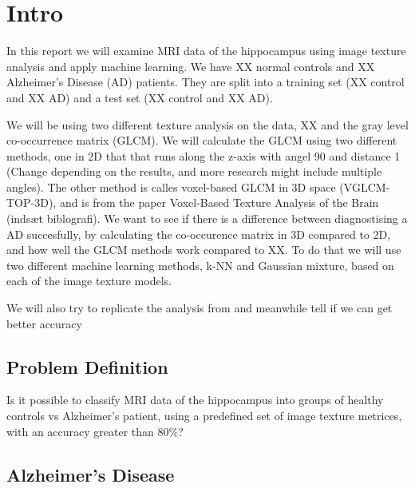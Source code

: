 \chapter{Intro}

In this report we will examine MRI data of the hippocampus using image texture analysis and apply machine learning. We have XX normal controls and XX Alzheimer's Disease (AD) patients. They are split into a training set (XX control and XX AD) and a test set (XX control and XX AD).

We will be using two different texture analysis on the data, XX and the gray level co-occ\-urren\-ce matrix (GLCM).
We will calculate the GLCM using two different methods, one in 2D that that runs along the z-axis with angel 90 and distance 1 (Change depending on the results, and more research might include multiple angles).\cite{Castellano}
The other method is calles voxel-based GLCM in 3D space (VGLCM-TOP-3D), and is from the paper Voxel-Based Texture Analysis of the Brain (indsæt biblografi).
We want to see if there is a difference between diagnostising a AD succesfully, by calculating the co-occurence matrix in 3D compared to 2D, and how well the GLCM methods work
compared to XX. To do that we will use two different machine learning methods, k-NN and Gaussian mixture, based on each of the image texture models.

We will also try to replicate the analysis from \cite{MRfreeborough} and meanwhile tell if we can get better accuracy


\section{Problem Definition}

Is it possible to classify MRI data of the hippocampus into groups of healthy controls vs Alzheimer's patient, using a predefined set of image texture metrices, with an accuracy great\-er than 80\%?

\section{Alzheimer's Disease}

